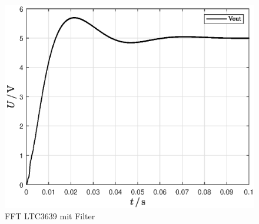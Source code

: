 \begin{figure}[H]
    \centering
    \includegraphics[width=0.8\linewidth]{Figure/Soft.eps}
    \caption{FFT LTC3639 mit Filter}
    \label{fig:SystemSoft}
\end{figure}